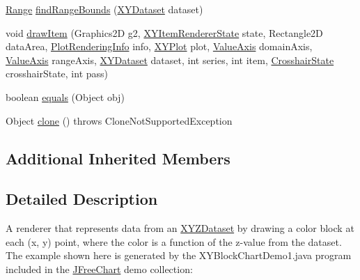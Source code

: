 \begin{DoxyCompactItemize}
\item 
\mbox{\hyperlink{classorg_1_1jfree_1_1data_1_1_range}{Range}} \mbox{\hyperlink{classorg_1_1jfree_1_1chart_1_1renderer_1_1xy_1_1_x_y_block_renderer_a5f3e45b813ff5e80bf488166c02cf26f}{find\+Range\+Bounds}} (\mbox{\hyperlink{interfaceorg_1_1jfree_1_1data_1_1xy_1_1_x_y_dataset}{X\+Y\+Dataset}} dataset)
\item 
void \mbox{\hyperlink{classorg_1_1jfree_1_1chart_1_1renderer_1_1xy_1_1_x_y_block_renderer_af40c39c5522bd7a9918570026243fe05}{draw\+Item}} (Graphics2D g2, \mbox{\hyperlink{classorg_1_1jfree_1_1chart_1_1renderer_1_1xy_1_1_x_y_item_renderer_state}{X\+Y\+Item\+Renderer\+State}} state, Rectangle2D data\+Area, \mbox{\hyperlink{classorg_1_1jfree_1_1chart_1_1plot_1_1_plot_rendering_info}{Plot\+Rendering\+Info}} info, \mbox{\hyperlink{classorg_1_1jfree_1_1chart_1_1plot_1_1_x_y_plot}{X\+Y\+Plot}} plot, \mbox{\hyperlink{classorg_1_1jfree_1_1chart_1_1axis_1_1_value_axis}{Value\+Axis}} domain\+Axis, \mbox{\hyperlink{classorg_1_1jfree_1_1chart_1_1axis_1_1_value_axis}{Value\+Axis}} range\+Axis, \mbox{\hyperlink{interfaceorg_1_1jfree_1_1data_1_1xy_1_1_x_y_dataset}{X\+Y\+Dataset}} dataset, int series, int item, \mbox{\hyperlink{classorg_1_1jfree_1_1chart_1_1plot_1_1_crosshair_state}{Crosshair\+State}} crosshair\+State, int pass)
\item 
boolean \mbox{\hyperlink{classorg_1_1jfree_1_1chart_1_1renderer_1_1xy_1_1_x_y_block_renderer_a58d4532db430db1cb95735762fca9398}{equals}} (Object obj)
\item 
Object \mbox{\hyperlink{classorg_1_1jfree_1_1chart_1_1renderer_1_1xy_1_1_x_y_block_renderer_a3f9950829869af112f42df68a0aec31f}{clone}} ()  throws Clone\+Not\+Supported\+Exception 
\end{DoxyCompactItemize}
\subsection*{Additional Inherited Members}


\subsection{Detailed Description}
A renderer that represents data from an \mbox{\hyperlink{}{X\+Y\+Z\+Dataset}} by drawing a color block at each (x, y) point, where the color is a function of the z-\/value from the dataset. The example shown here is generated by the {\ttfamily X\+Y\+Block\+Chart\+Demo1.\+java} program included in the \mbox{\hyperlink{classorg_1_1jfree_1_1chart_1_1_j_free_chart}{J\+Free\+Chart}} demo collection\+: ~\newline
~\newline
 

